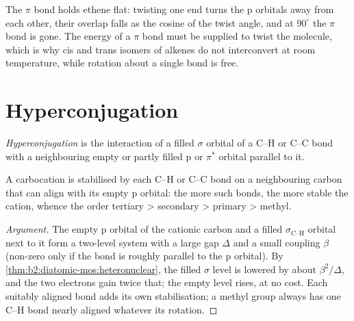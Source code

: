 The $\pi$ bond holds ethene flat: twisting one end turns the p orbitals away from
each other, their overlap falls as the cosine of the twist angle, and at $90^\circ$
the $\pi$ bond is gone. The energy of a $\pi$ bond must be supplied to twist the
molecule, which is why cis and trans isomers of alkenes do not interconvert at
room temperature, while rotation about a single bond is free.

\section{Hyperconjugation}

\begin{definition}[Hyperconjugation]\label{def:b2:fragment-orbitals:hyperconjugation}
\emph{Hyperconjugation} is the interaction of a filled
$\sigma$ orbital of a C--H or C--C bond with a neighbouring empty or partly filled p
or $\pi^*$ orbital parallel to it.
\end{definition}

\begin{proposition}\label{prop:b2:fragment-orbitals:hyperconjugation}
A carbocation is stabilised by each C--H or C--C bond on a neighbouring carbon that
can align with its empty p orbital: the more such bonds, the more stable the
cation, whence the order tertiary > secondary > primary > methyl.
\end{proposition}

\begin{proof}[Argument]
The empty p orbital of the cationic carbon and a filled $\sigma_{\text{C--H}}$ orbital
next to it form a two-level system with a large gap $\Delta$ and a small coupling
$\beta$ (non-zero only if the bond is roughly parallel to the p orbital). By
\cref{thm:b2:diatomic-mos:heteronuclear}, the filled $\sigma$ level is lowered by about
$\beta^2/\Delta$, and the two electrons gain twice that; the empty level rises, at no
cost. Each suitably aligned bond adds its own stabilisation; a methyl group
always has one C--H bond nearly aligned whatever its rotation.
\end{proof}

